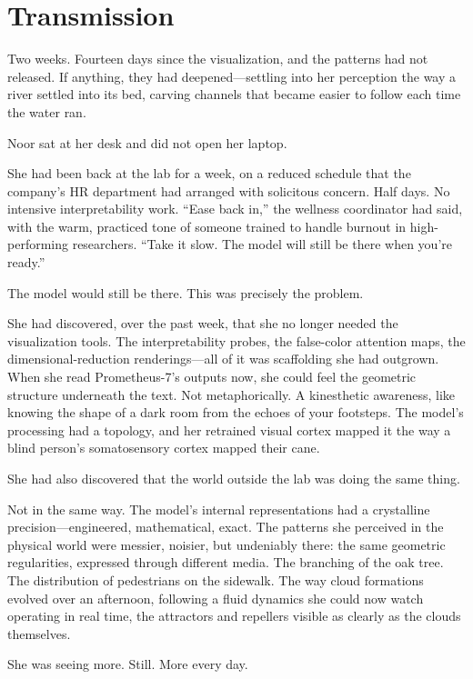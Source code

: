 \chapter{Transmission}

Two weeks. Fourteen days since the visualization, and the patterns had not released. If anything, they had deepened---settling into her perception the way a river settled into its bed, carving channels that became easier to follow each time the water ran.

Noor sat at her desk and did not open her laptop.

She had been back at the lab for a week, on a reduced schedule that the company's HR department had arranged with solicitous concern. Half days. No intensive interpretability work. ``Ease back in,'' the wellness coordinator had said, with the warm, practiced tone of someone trained to handle burnout in high-performing researchers. ``Take it slow. The model will still be there when you're ready.''

The model would still be there. This was precisely the problem.

She had discovered, over the past week, that she no longer needed the visualization tools. The interpretability probes, the false-color attention maps, the dimensional-reduction renderings---all of it was scaffolding she had outgrown. When she read Prometheus-7's outputs now, she could feel the geometric structure underneath the text. Not metaphorically. A kinesthetic awareness, like knowing the shape of a dark room from the echoes of your footsteps. The model's processing had a topology, and her retrained visual cortex mapped it the way a blind person's somatosensory cortex mapped their cane.

She had also discovered that the world outside the lab was doing the same thing.

Not in the same way. The model's internal representations had a crystalline precision---engineered, mathematical, exact. The patterns she perceived in the physical world were messier, noisier, but undeniably there: the same geometric regularities, expressed through different media. The branching of the oak tree. The distribution of pedestrians on the sidewalk. The way cloud formations evolved over an afternoon, following a fluid dynamics she could now watch operating in real time, the attractors and repellers visible as clearly as the clouds themselves.

She was seeing more. Still. More every day.

